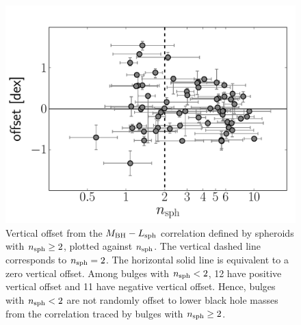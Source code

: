 \documentclass[preprint2]{emulateapj}
\begin{document}
\begin{figure}[h]
\begin{center}
\includegraphics[width=\columnwidth]{images/inset_psb.pdf}
\caption{Vertical offset from the $M_{\rm BH} - L_{\rm sph}$ correlation defined by spheroids with $n_{\rm sph} \geq 2$, 
plotted against $n_{\rm sph}$. 
The vertical dashed line corresponds to $n_{\rm sph} = 2$.
The horizontal solid line is equivalent to a zero vertical offset.
Among bulges with $n_{\rm sph}<2$, 12 have positive vertical offset and 11 have negative vertical offset.
Hence, bulges with $n_{\rm sph}<2$ are not randomly offset to lower black hole masses 
from the correlation traced by bulges with $n_{\rm sph} \geq 2$.}
\label{fig:pseudob}
\end{center}
\end{figure}
\end{document}

